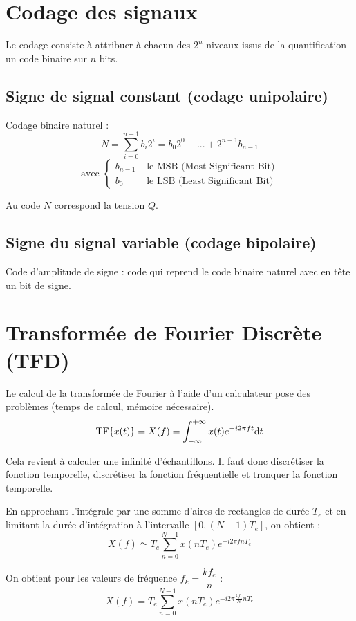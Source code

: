 \documentclass[a4paper,12pt]{article}
\begin{document}
\section{Codage des signaux}

Le codage consiste à attribuer à chacun des $2^n$ niveaux issus de la quantification un code binaire sur $n$ bits.

\subsection{Signe de signal constant (codage unipolaire)}

Codage binaire naturel :
\[ N = \sum_{i=0}^{n-1} b_i 2^i = b_0 2^0 + ... + 2^{n-1} b_{n-1} \]
\[ \text{avec } \begin{cases}
    b_{n-1} & \text{ le MSB (Most Significant Bit)} \\
    b_{0} & \text{ le LSB (Least Significant Bit)}
\end{cases} \]

Au code $N$ correspond la tension $Q$.

\subsection{Signe du signal variable (codage bipolaire)}

Code d'amplitude de signe : code qui reprend le code binaire naturel avec en tête un bit de signe.

\section{Transformée de Fourier Discrète (TFD)}

Le calcul de la transformée de Fourier à l'aide d'un calculateur pose des problèmes (temps de calcul, mémoire nécessaire).
\[ \mathrm{TF} \{ x(t) \} = X(f) = \int_{-\infty}^{+\infty} x(t) e^{-i2\pi ft} \mathrm{d}t \]

Cela revient à calculer une infinité d'échantillons. Il faut donc discrétiser la fonction temporelle, discrétiser la fonction fréquentielle et tronquer la fonction temporelle.

En approchant l'intégrale par une somme d'aires de rectangles de durée $T_e$ et en limitant la durée d'intégration à l'intervalle $[0, (N-1)T_e]$, on obtient :
\[ X(f) \simeq T_e \sum_{n=0}^{N-1} x(nT_e) e^{-i2\pi fnT_e} \]

On obtient pour les valeurs de fréquence $f_k = \dfrac{kf_e}{n}$ :
\[ X(f) = T_e \sum_{n=0}^{N-1} x(nT_e) e^{-i2\pi \frac{kf_e}{N} nT_e} \]
\end{document}
